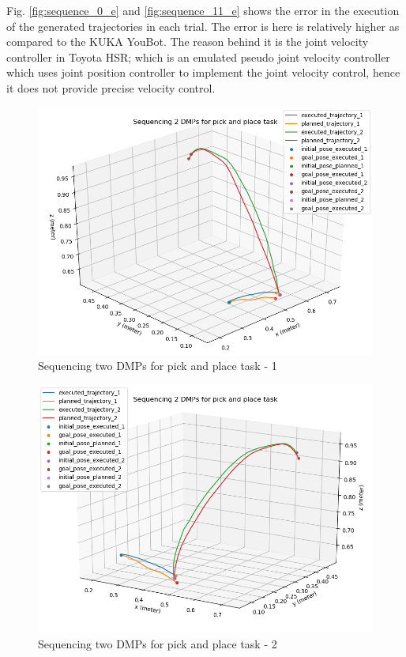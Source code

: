 Fig. \ref{fig:sequence_0_e} and \ref{fig:sequence_11_e} shows the error in the execution of the generated trajectories in each trial. The error is here is relatively higher as compared to the KUKA YouBot. The reason behind it is the joint velocity controller in Toyota HSR; which is an emulated pseudo joint velocity controller which uses joint position controller to implement the joint velocity control, hence it does not provide precise velocity control.   

\begin{figure}[H]
	\centering
	\includegraphics[scale=0.55]{images/HSR_3/sequence.png}
	\caption{Sequencing two DMPs for pick and place task - 1}
	\label{fig:sequence_0}
\end{figure}

\begin{figure}[H]
	\centering
	\includegraphics[scale=0.55]{images/HSR_3/sequence_1.png}
	\caption{Sequencing two DMPs for pick and place task - 2}
	\label{fig:sequence_1}
\end{figure}


